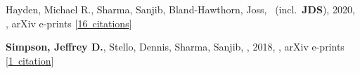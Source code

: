 \item[{\color{numcolor}\scriptsize2}] Hayden, Michael R., Sharma, Sanjib, Bland-Hawthorn, Joss, \etal\ (incl.\ \textbf{JDS}), 2020, , arXiv e-prints [\href{https://ui.adsabs.harvard.edu/#abs/2020arXiv201113745H}{16~citations}]

\item[{\color{numcolor}\scriptsize1}] \textbf{Simpson, Jeffrey D.}, Stello, Dennis, Sharma, Sanjib, \etal, 2018, , arXiv e-prints [\href{https://ui.adsabs.harvard.edu/#abs/2018arXiv180405900S}{1~citation}]
